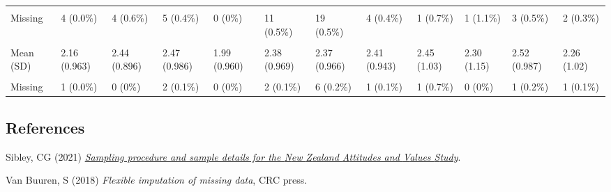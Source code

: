 \documentclass[
  single column]{article}
\newlength{\cslhangindent}
\newenvironment{CSLReferences}[2] %
 {\begin{list}{}{%
  \setlength{\itemindent}{0pt}
  \setlength{\leftmargin}{0pt}
  \setlength{\parsep}{0pt}
  \ifodd #1
   \setlength{\leftmargin}{\cslhangindent}
   \setlength{\itemindent}{-1\cslhangindent}
  \fi
  \setlength{\itemsep}{#2\baselineskip}}}
 {\end{list}}
\begin{document}
\begin{landscape}
\begin{longtable}[t]{llllllllllll}
\cellcolor{gray!10}{Median [Min, Max]} & \cellcolor{gray!10}{2.83 [1.00, 7.00]} & \cellcolor{gray!10}{4.50 [1.00, 7.00]} & \cellcolor{gray!10}{3.83 [1.00, 7.00]} & \cellcolor{gray!10}{2.82 [1.00, 6.50]} & \cellcolor{gray!10}{3.83 [1.00, 7.00]} & \cellcolor{gray!10}{4.17 [1.00, 7.00]} & \cellcolor{gray!10}{4.33 [1.00, 7.00]} & \cellcolor{gray!10}{3.50 [1.60, 5.50]} & \cellcolor{gray!10}{3.10 [1.00, 6.00]} & \cellcolor{gray!10}{4.00 [1.00, 7.00]} & \cellcolor{gray!10}{3.00 [1.00, 7.00]}\\
Missing & 4 (0.0\%) & 4 (0.6\%) & 5 (0.4\%) & 0 (0\%) & 11 (0.5\%) & 19 (0.5\%) & 4 (0.4\%) & 1 (0.7\%) & 1 (1.1\%) & 3 (0.5\%) & 2 (0.3\%)\\
\cellcolor{gray!10}{Social Dominance Orientation} & \cellcolor{gray!10}{} & \cellcolor{gray!10}{} & \cellcolor{gray!10}{} & \cellcolor{gray!10}{} & \cellcolor{gray!10}{} & \cellcolor{gray!10}{} & \cellcolor{gray!10}{} & \cellcolor{gray!10}{} & \cellcolor{gray!10}{} & \cellcolor{gray!10}{} & \cellcolor{gray!10}{}\\
\addlinespace
Mean (SD) & 2.16 (0.963) & 2.44 (0.896) & 2.47 (0.986) & 1.99 (0.960) & 2.38 (0.969) & 2.37 (0.966) & 2.41 (0.943) & 2.45 (1.03) & 2.30 (1.15) & 2.52 (0.987) & 2.26 (1.02)\\
\cellcolor{gray!10}{Median [Min, Max]} & \cellcolor{gray!10}{2.00 [1.00, 7.00]} & \cellcolor{gray!10}{2.33 [1.00, 5.33]} & \cellcolor{gray!10}{2.33 [1.00, 6.33]} & \cellcolor{gray!10}{1.80 [1.00, 5.67]} & \cellcolor{gray!10}{2.33 [1.00, 6.00]} & \cellcolor{gray!10}{2.33 [1.00, 7.00]} & \cellcolor{gray!10}{2.33 [1.00, 5.67]} & \cellcolor{gray!10}{2.33 [1.00, 6.80]} & \cellcolor{gray!10}{2.00 [1.00, 5.67]} & \cellcolor{gray!10}{2.50 [1.00, 6.67]} & \cellcolor{gray!10}{2.17 [1.00, 7.00]}\\
Missing & 1 (0.0\%) & 0 (0\%) & 2 (0.1\%) & 0 (0\%) & 2 (0.1\%) & 6 (0.2\%) & 1 (0.1\%) & 1 (0.7\%) & 0 (0\%) & 1 (0.2\%) & 1 (0.1\%)\\*

\end{longtable}

\endgroup{}


\end{landscape}

\newpage{}

\subsection*{References}\label{references}

\label{refs}
\begin{CSLReferences}{1}{0}
Sibley, CG (2021)
\emph{\href{https://doi.org/10.31234/osf.io/wgqvy}{Sampling procedure
and sample details for the {N}ew {Z}ealand {A}ttitudes and {V}alues
{S}tudy}}.

Van Buuren, S (2018) \emph{Flexible imputation of missing data}, CRC
press.

\end{CSLReferences}
\end{document}
